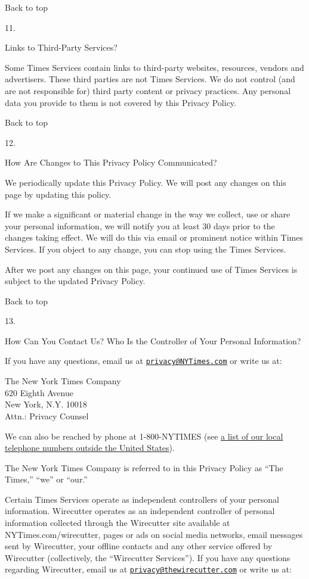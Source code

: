 Back to top

11.

Links to Third-Party Services?

Some Times Services contain links to third-party websites, resources,
vendors and advertisers. These third parties are not Times Services. We
do not control (and are not responsible for) third party content or
privacy practices. Any personal data you provide to them is not covered
by this Privacy Policy.

Back to top

12.

How Are Changes to This Privacy Policy Communicated?

We periodically update this Privacy Policy. We will post any changes on
this page by updating this policy.

If we make a significant or material change in the way we collect, use
or share your personal information, we will notify you at least 30 days
prior to the changes taking effect. We will do this via email or
prominent notice within Times Services. If you object to any change, you
can stop using the Times Services.

After we post any changes on this page, your continued use of Times
Services is subject to the updated Privacy Policy.

Back to top

13.

How Can You Contact Us? Who Is the Controller of Your Personal
Information?

If you have any questions, email us at
\href{mailto:privacy@NYTimes.com}{\nolinkurl{privacy@NYTimes.com}} or
write us at:

The New York Times Company\\
620 Eighth Avenue\\
New York, N.Y. 10018\\
Attn.: Privacy Counsel

We can also be reached by phone at 1-800-NYTIMES (see
\href{https://subscribe.inyt.com/footer?requestAction=displayContactIht}{a
list of our local telephone numbers outside the United States}).

The New York Times Company is referred to in this Privacy Policy as
``The Times,'' ``we'' or ``our.''

Certain Times Services operate as independent controllers of your
personal information. Wirecutter operates as an independent controller
of personal information collected through the Wirecutter site available
at NYTimes.com/wirecutter, pages or ads on social media networks, email
messages sent by Wirecutter, your offline contacts and any other service
offered by Wirecutter (collectively, the ``Wirecutter Services''). If
you have any questions regarding Wirecutter, email us at
\href{mailto:privacy@thewirecutter.com}{\nolinkurl{privacy@thewirecutter.com}}
or write us at:

